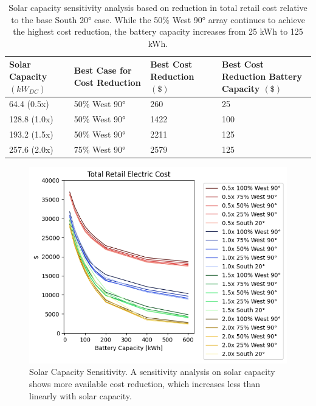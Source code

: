 \documentclass[journal,article,submit,pdftex,moreauthors]{Definitions/mdpi}
\begin{document}
\begin{table}[!h]
  \caption{Solar capacity sensitivity analysis based on reduction in total retail cost relative to the base South 20° case. While the 50\% West 90° array continues to achieve the highest cost reduction, the battery capacity increases from 25 kWh to 125 kWh.}
  \label{tab:solar-sensitivity}
  \begin{tabularx}{\textwidth}{XXXX}
    \toprule
    Solar Capacity $(kW_{DC})$ & Best Case for Cost Reduction         & Best
    Cost Reduction $(\$)$          & Best Cost Reduction Battery Capacity
    $(\$)$                                                                            \\
    \midrule
    64.4 (0.5x)                      & 50\% West 90°                        & 260  & 25  \\
    128.8 (1.0x)                     & 50\% West 90°                        & 1422 & 100 \\
    193.2 (1.5x)                     & 50\% West 90°                        & 2211 & 125 \\
    257.6 (2.0x)                     & 75\% West 90°                        & 2579 & 125 \\
    \bottomrule
  \end{tabularx}
\end{table}


\begin{figure}
  \centering
  \includegraphics[width=0.8\linewidth]{./images/total cost reduction solar sensitivity.png}
  \caption{Solar Capacity Sensitivity. A sensitivity analysis on solar capacity shows more available cost reduction, which increases less than linearly with solar capacity.}
  \label{fig:solar-sensitivity}
\end{figure}
\end{document}
